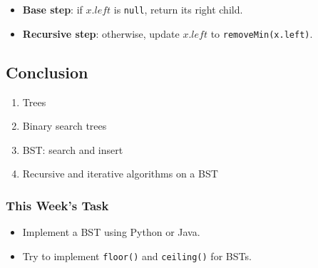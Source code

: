 \documentclass[aspectratio=169, 14pt]{beamer}
\begin{document}
\begin{frame}
\begin{itemize}
  \item \textbf{Base step}: if $x.left$ is \texttt{null}, return its right child.
  \item \textbf{Recursive step}: otherwise, update $x.left$ to \texttt{removeMin(x.left)}.
\end{itemize}

\end{frame}

\begin{frame}


\end{frame}

\begin{frame}
  
  \section{\textcolor{darkmidnightblue}{Conclusion}} 

  \begin{enumerate}
    \item Trees
    \item Binary search trees
    \item BST: search and insert
    \item Recursive and iterative algorithms on a BST
  \end{enumerate}
\end{frame}

\begin{frame}
  \frametitle{This Week's Task}
\begin{itemize}
  \item Implement a BST using Python or Java.
  \item Try to implement \texttt{floor()} and \texttt{ceiling()} for BSTs.
\end{itemize}  

\end{frame}
\end{document}
